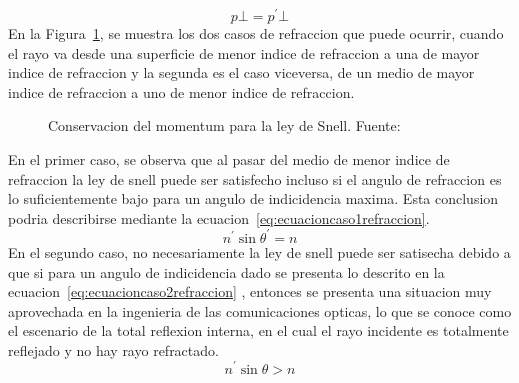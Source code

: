 \documentclass[letterpaper, 10 pt, conference]{ieeeconf}  %
\begin{document}
\begin{equation}
\label{eq:cantidadmovimientolat}
{
p \bot  = {p^'} \bot
}
\end{equation}
En la Figura~\ref{fig:TiposRefraccion}, se muestra los dos casos de refraccion que puede ocurrir, cuando el rayo va desde una superficie de menor indice de refraccion a una de mayor indice de refraccion y la segunda es el caso viceversa, de un medio de mayor indice de refraccion a uno de menor indice de refraccion.
\begin{figure}[ht!]
\caption{Conservacion del momentum para la ley de Snell. Fuente:~\cite{1}
}\label{fig:TiposRefraccion}
\end{figure}
En el primer caso, se observa que al pasar del medio de menor indice de refraccion la ley de snell puede ser satisfecho incluso si el angulo de refraccion es lo suficientemente bajo para un angulo de indicidencia maxima. Esta conclusion podria describirse mediante la ecuacion~\eqref{eq:ecuacioncaso1refraccion}.
\begin{equation}
\label{eq:ecuacioncaso1refraccion}
{
{n^'}\sin {\theta ^'} = n
}
\end{equation}
En el segundo caso, no necesariamente la ley de snell puede ser satisecha debido a  que si para un angulo de indicidencia dado se presenta lo descrito en la ecuacion~\eqref{eq:ecuacioncaso2refraccion} , entonces se presenta una situacion muy aprovechada en la ingenieria de las comunicaciones opticas, lo que se conoce como el escenario de la total reflexion interna, en el cual el rayo incidente es totalmente reflejado y no hay rayo refractado.
\begin{equation}
\label{eq:ecuacioncaso2refraccion}
{
{n^'}\sin \theta  > n
}
\end{equation}
\end{document}
